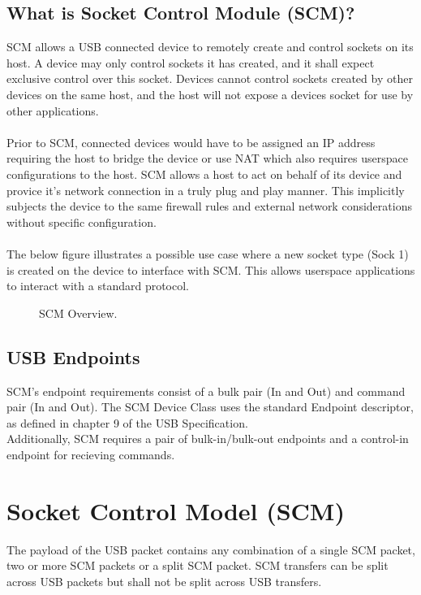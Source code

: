 \documentclass[10pt]{article}
\begin{document}
	\subsection{What is Socket Control Module (SCM)?}
	SCM allows a USB connected device to remotely create and control sockets on its host. A device may only control sockets it has created, and it shall expect exclusive control over this socket. Devices cannot control sockets created by other devices on the same host, and the host will not expose a devices socket for use by other applications.\\
	\\
	Prior to SCM, connected devices would have to be assigned an IP address requiring the host to bridge the device or use NAT which also requires userspace configurations to the host. SCM allows a host to act on behalf of its device and provice it's network connection in a truly plug and play manner. This implicitly subjects the device to the same firewall rules and external network considerations without specific configuration.\\
	\\
	The below figure illustrates a possible use case where a new socket type (Sock 1) is created on the device to interface with SCM. This allows userspace applications to interact with a standard protocol. 
	\begin{figure}[H]
		\begin{center}
			\caption[SCM Overview]{SCM Overview.}
			\scalebox{0.9}{}
		\end{center}
	\end{figure}

	\subsection{USB Endpoints}
	SCM's endpoint requirements consist of a bulk pair (In and Out) and command pair (In and Out). 
	The SCM Device Class uses the standard Endpoint descriptor, as defined in chapter 9 of the USB
	Specification. \\
	Additionally, SCM requires a pair of bulk-in/bulk-out endpoints and a control-in endpoint for recieving commands.
	\section{Socket Control Model (SCM)}
	The payload of the USB packet contains any combination of a single SCM packet, 
	two or more SCM packets or a split SCM packet. SCM transfers can be split across USB packets but shall not be split across USB transfers. 
\end{document}
